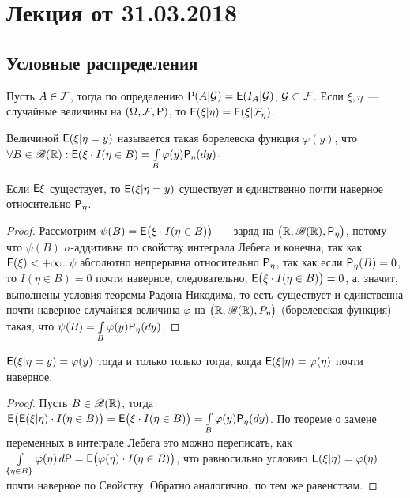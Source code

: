 \section{Лекция от 31.03.2018}
 \subsection*{Условные распределения}
 \begin{definition}
 	Пусть $A \in \F$, тогда по определению $\P(A | \G) = \E( I_A | \G)$, $\G \subset \F$. Если $\xi, \eta$~--- случайные величины на $(\Omega, \F, \P)$, то $\E(\xi | \eta) = \E(\xi | \F_\eta)$.
 \end{definition}
 \begin{definition}
 	Величиной $\E (\xi | \eta = y)$ называется такая борелевска функция $\varphi(y)$, 
 	что $\forall B \in \B(\R): \E(\xi \cdot I(\eta \in B) = 
 	\int\limits_B \varphi(y) \P_\eta (d y)$.
 \end{definition}
 \begin{lemma}
 	Если $\E \xi$ существует, то $\E( \xi | \eta = y)$ существует и единственно почти 
 	наверное относительно $\P_\eta$.
 	\begin{proof}
 		Рассмотрим $\psi(B) = \E \big( \xi \cdot I (\eta \in B) \big)$~--- заряд на 
 		$\big( \R, \B(\R), \P_\eta \big)$, потому что $\psi(B)$ $\sigma$-аддитивна по
 		 свойству интеграла Лебега и конечна, так как $\E(\xi) < +\infty$. 
 		 $\psi$ абсолютно непрерывна относительно $\P_\eta$, так как если 
 		 $\P_\eta(B) = 0$, то $I(\eta \in B) = 0$ почти наверное, следовательно, 
 		 $\E \big( \xi \cdot I (\eta \in B) \big) = 0$, а, значит, выполнены условия 
 		 теоремы Радона-Никодима, то есть существует и единственна почти наверное 
 		 случайная величина $\varphi$ на $\big( \R, \B(\R), P_\eta \big)$ 
 		 (борелевская функция) такая, что 
 		 $\psi(B) = \int\limits_B \varphi(y) \P_\eta(dy)$.
 	\end{proof}
 \end{lemma}
 \begin{lemma}
 	$\E ( \xi | \eta = y) = \varphi(y)$ тогда и только только тогда, когда 
 	$\E(\xi | \eta) = \varphi(\eta)$ почти наверное.
 	\begin{proof}
 		Пусть $B \in \B(\R)$, тогда 
 		$\E \big( \E(\xi | \eta) \cdot I (\eta \in B) \big) = 
 		\E \big( \xi \cdot I(\eta \in B) \big) = \int\limits_B \varphi(y) \P_\eta(d y)$. 
 		По теореме о замене переменных в интеграле Лебега это можно переписать, как 
 		$\int\limits_{\{\eta \in B \}} \varphi(\eta) \, d \P = 
 		\E \big( \varphi(\eta) \cdot I (\eta \in B) \big)$, 
 		что равносильно условию $\E(\xi | \eta) = \varphi(\eta)$ 
 		почти наверное по Свойству. Обратно аналогично, по тем же равенствам.
 	\end{proof}
 \end{lemma}

